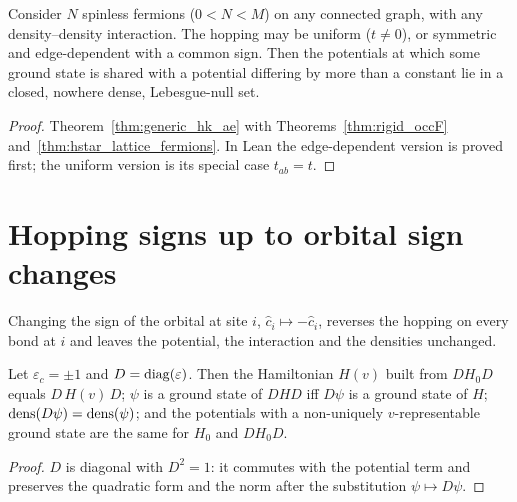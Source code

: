 \begin{theorem}
  \label{thm:generic_hk_lattice_fermions}
  \leanok
  Consider $N$ spinless fermions ($0<N<M$) on any connected graph, with any density--density interaction.
  The hopping may be uniform ($t\ne0$), or symmetric and edge-dependent with a common sign. Then the
  potentials at which some ground state is shared with a potential differing by more than a constant lie in
  a closed, nowhere dense, Lebesgue-null set.
\end{theorem}
\begin{proof}
  \leanok
  Theorem~\ref{thm:generic_hk_ae} with Theorems~\ref{thm:rigid_occF} and~\ref{thm:hstar_lattice_fermions}.
  In Lean the edge-dependent version is proved first; the uniform version is its special case
  $t_{ab}=t$.
\end{proof}

\section{Hopping signs up to orbital sign changes}

Changing the sign of the orbital at site $i$, $\hat c_i\mapsto-\hat c_i$, reverses the hopping on every bond at $i$
and leaves the potential, the interaction and the densities unchanged.

\begin{lemma}
  \label{lem:signConj}
  \leanok
  Let $\varepsilon_c=\pm1$ and $D=\operatorname{diag}(\varepsilon)$. Then the Hamiltonian $H(v)$ built from $DH_0D$ equals
  $D\,H(v)\,D$; $\psi$ is a ground
  state of $DHD$ iff $D\psi$ is a ground state of $H$; $\operatorname{dens}(D\psi)=\operatorname{dens}(\psi)$; and the potentials with a
  non-uniquely $v$-representable ground state are the same for $H_0$ and $DH_0D$.
\end{lemma}
\begin{proof}
  \leanok
  $D$ is diagonal with $D^2=1$: it commutes with the potential term and preserves the quadratic form and the
  norm after the substitution $\psi\mapsto D\psi$.
\end{proof}

